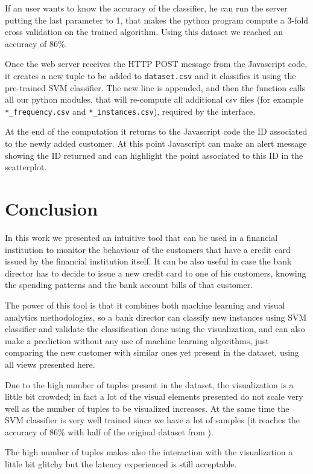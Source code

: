 \documentclass[journal]{vgtc}                %
\begin{document}
If an user wants to know the accuracy of the classifier, he can run the server putting the last parameter to 1, that makes the python program compute a 3-fold cross validation on the trained algorithm. Using this dataset we reached an accuracy of 86\%.

Once the web server receives the HTTP POST message from the Javascript code, it creates a new tuple to be added to \texttt{dataset.csv} and it classifies it using the pre-trained SVM classifier. The new line is appended, and then the function calls all our python modules,
 that will re-compute all additional csv files (for example \texttt{*\_frequency.csv} and \texttt{*\_instances.csv}), required by the interface.


At the end of the computation it returns to the Javascript code the ID associated to the newly added customer.
At this point Javascript can make an alert message showing the ID returned and can highlight the point associated to this ID in the scatterplot.

\section{Conclusion}

In this work we presented an intuitive tool that can be used in a financial institution to monitor the behaviour of the customers that have a credit card issued by the financial institution itself. It can be also useful in case
the bank director has to decide to issue a new credit card to one of his customers, knowing the spending patterns and the bank account bills of that customer.

The power of this tool is that it combines both machine learning and visual analytics methodologies, so a bank director can classify new instances using SVM classifier and validate the classification done using the visualization, and can also make a prediction
without any use of machine learning algorithms, just comparing the new customer with similar ones yet present in the dataset, using all views presented here.

Due to the high number of tuples present in the dataset, the visualization is a little bit crowded; in fact a lot of the visual elements presented do not scale very well as the number of tuples to be visualized increases. At the same time the SVM classifier is
very well trained since we have a lot of samples (it reaches the accuracy of 86\% with half of the original dataset from \cite{UCI:2016}).

The high number of tuples makes also the interaction with the visualization a little bit glitchy but the latency experienced is still acceptable.




\end{document}
